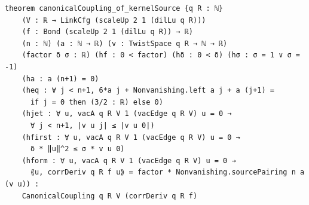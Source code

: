 \begin{theorem}[bp-156]
\begin{verbatim}
theorem canonicalCoupling_of_kernelSource {q R : ℕ}
    (V : ℝ → LinkCfg (scaleUp 2 1 (dilLu q R)))
    (f : Bond (scaleUp 2 1 (dilLu q R)) → ℝ)
    (n : ℕ) (a : ℕ → ℝ) (v : TwistSpace q R → ℕ → ℝ)
    (factor δ σ : ℝ) (hf : 0 < factor) (hδ : 0 < δ) (hσ : σ = 1 ∨ σ = -1)
    (ha : a (n+1) = 0)
    (heq : ∀ j < n+1, 6*a j + Nonvanishing.left a j + a (j+1) =
      if j = 0 then (3/2 : ℝ) else 0)
    (hjet : ∀ u, vacA q R V 1 (vacEdge q R V) u = 0 →
      ∀ j < n+1, |v u j| ≤ |v u 0|)
    (hfirst : ∀ u, vacA q R V 1 (vacEdge q R V) u = 0 →
      δ * ‖u‖^2 ≤ σ * v u 0)
    (hform : ∀ u, vacA q R V 1 (vacEdge q R V) u = 0 →
      ⟪u, corrDeriv q R f u⟫ = factor * Nonvanishing.sourcePairing n a (v u)) :
    CanonicalCoupling q R V (corrDeriv q R f)
\end{verbatim}
\end{theorem}

